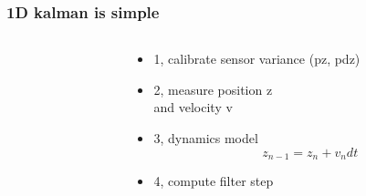 \documentclass{beamer}
\begin{document}
\begin{frame}
  
  \frametitle{1D kalman is simple}    

    \begin{columns}

      \begin{column}{0.5\textwidth}
      \end{column}
  
      \begin{column}{0.5\textwidth}
        \begin{itemize}
          \item 1, calibrate sensor variance (pz, pdz)
          \item 2, measure position z \\ and velocity v
          \item 3, dynamics model $$z_{n-1} = z_{n} + v_{n}dt$$
          \item 4, compute filter step
        \end{itemize}
      \end{column}
  
    \end{columns}

\end{frame}
\end{document}
